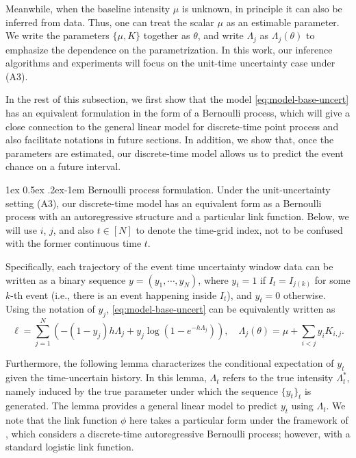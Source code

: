 \documentclass[11pt]{article}
\makeatletter
\theoremstyle{remark}
\theoremstyle{plain}
\renewcommand{\paragraph}{%
  \@startsection{paragraph}{4}%
  {\z@}{1ex \@plus 0.5ex \@minus .2ex}{-1em}%
  {\normalfont\normalsize\itshape}%
}
\makeatother
\begin{document}
Meanwhile, when the baseline intensity $\mu$ is unknown, in principle it can also be inferred from data. 
Thus, one can treat the scalar $\mu$ as an estimable parameter. 
We write the parameters $\{\mu ,K \} $ together as $\theta$, 
and write $\Lambda_j$ as $\Lambda_j (\theta)$ to emphasize the dependence on the parametrization. 
In this work,  our inference algorithms and experiments will focus on the unit-time uncertainty case under (A3).

In the rest of this subsection, we first show  that  the model \eqref{eq:model-base-uncert} has an equivalent formulation in the form of a Bernoulli process,
which will give a close connection to the general linear model for discrete-time point process \cite{juditsky2020convex} 
and also facilitate notations in future sections.
%
In addition, we show that, once the parameters are estimated, our discrete-time model allows us to predict the event chance on a future interval.


\paragraph{Bernoulli process formulation.}
Under the unit-uncertainty setting (A3), our discrete-time model has an equivalent form as a Bernoulli process with an autoregressive structure and a particular link function. Below, we will use $i$, $j$, and also $t \in [N]$ to denote the time-grid index, not to be confused with the former continuous time $t$.

Specifically,  each trajectory of the event time uncertainty window data can be written as a  binary sequence $y = (y_1, \cdots, y_N)$, 
where $y_t = 1$ if $I_t = I_{j(k)} $ for some $k$-th event (i.e., there is an event happening inside $I_t$), 
and $y_t = 0$ otherwise. 
Using the notation of $y_j$, 
\eqref{eq:model-base-uncert} can be equivalently written as
\begin{equation}\label{eq:model-base-uncert-bernoulli}
\ell
= \sum_{j=1}^N \left( 
- (1-y_j ) h  
\Lambda_j +  y_j  \log ( 1 - e^{ - 
 h
\Lambda_j} )
\right), \quad
\Lambda_j ( \theta )
=  \mu+ \sum_{ i < j}  y_i  K_{i, j}.
\end{equation}

Furthermore, the following lemma characterizes the conditional expectation of $y_t$ given the time-uncertain history. In this lemma, $\Lambda_t $ refers to the true intensity $\Lambda_t^*$, namely induced by the true parameter under which the sequence $\{ y_t \}_t$ is generated. 
The lemma provides a general linear model to predict $y_t$ using $\Lambda_t$.
We note that the link function $\phi$ here takes a particular form under the framework of \cite{juditsky2020convex}, which considers a discrete-time autoregressive Bernoulli process; however, with a standard logistic link function.
\end{document}
